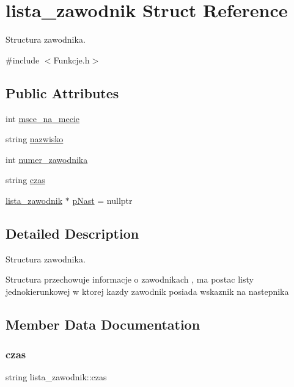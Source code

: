 \hypertarget{structlista__zawodnik}{}\section{lista\+\_\+zawodnik Struct Reference}
\label{structlista__zawodnik}


Structura zawodnika.  




{\ttfamily \#include $<$Funkcje.\+h$>$}

\subsection*{Public Attributes}
\begin{DoxyCompactItemize}
\item 
int \mbox{\hyperlink{structlista__zawodnik_aee7ce2c8a9ec1e0ff1b426b2ae5e78ac}{msce\+\_\+na\+\_\+mecie}}
\item 
string \mbox{\hyperlink{structlista__zawodnik_a031e84480ad8143556ba80358552689c}{nazwisko}}
\item 
int \mbox{\hyperlink{structlista__zawodnik_a1c0ad4d316e72c1905a27428eab8def2}{numer\+\_\+zawodnika}}
\item 
string \mbox{\hyperlink{structlista__zawodnik_a8878122d614d27085c5fd3d92d827220}{czas}}
\item 
\mbox{\hyperlink{structlista__zawodnik}{lista\+\_\+zawodnik}} $\ast$ \mbox{\hyperlink{structlista__zawodnik_a4d7a9047ca829ed98e4736beff5af874}{p\+Nast}} = nullptr
\end{DoxyCompactItemize}


\subsection{Detailed Description}
Structura zawodnika. 

Structura przechowuje informacje o zawodnikach , ma postac listy jednokierunkowej w ktorej kazdy zawodnik posiada wskaznik na nastepnika 

\subsection{Member Data Documentation}
\mbox{\label{structlista__zawodnik_a8878122d614d27085c5fd3d92d827220}} 
\subsubsection{\texorpdfstring{czas}{czas}}
{\footnotesize\ttfamily string lista\+\_\+zawodnik\+::czas}

